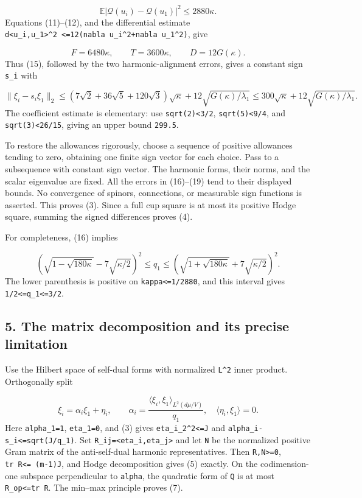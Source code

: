 \documentclass[
  11pt,
]{article}
\begin{document}
\[
 \mathbb E|\mathcal Q(u_i)-\mathcal Q(u_1)|^2\le2880\kappa.
 \tag{17}
\] Equations (11)--(12), and the differential estimate
\texttt{\textbar{}d\textless{}u\_i,u\_1\textgreater{}\textbar{}\^{}2\ \textless{}=12(\textbar{}nabla\ u\_i\textbar{}\^{}2+\textbar{}nabla\ u\_1\textbar{}\^{}2)},
give

\[
 F=6480\kappa,\qquad T=3600\kappa,\qquad D=12G(\kappa).
 \tag{18}
\] Thus (15), followed by the two harmonic-alignment errors, gives a
constant sign \texttt{s\_i} with

\[
 \|\xi_i-s_i\xi_1\|_2
 \le\left(7\sqrt2+36\sqrt5+120\sqrt3\right)\sqrt\kappa
                  +12\sqrt{G(\kappa)/\lambda_1}
 \le300\sqrt\kappa+12\sqrt{G(\kappa)/\lambda_1}.       \tag{19}
\] The coefficient estimate is elementary: use
\texttt{sqrt(2)\textless{}3/2}, \texttt{sqrt(5)\textless{}9/4}, and
\texttt{sqrt(3)\textless{}26/15}, giving an upper bound \texttt{299.5}.

To restore the allowances rigorously, choose a sequence of positive
allowances tending to zero, obtaining one finite sign vector for each
choice. Pass to a subsequence with constant sign vector. The harmonic
forms, their norms, and the scalar eigenvalue are fixed. All the errors
in (16)--(19) tend to their displayed bounds. No convergence of spinors,
connections, or measurable sign functions is asserted. This proves (3).
Since a full cup square is at most its positive Hodge square, summing
the signed differences proves (4).

For completeness, (16) implies

\[
 \left(\sqrt{1-\sqrt{180\kappa}}-7\sqrt{\kappa/2}\right)^2
 \le q_1\le
 \left(\sqrt{1+\sqrt{180\kappa}}+7\sqrt{\kappa/2}\right)^2.
 \tag{20}
\] The lower parenthesis is positive on
\texttt{kappa\textless{}=1/2880}, and this interval gives
\texttt{1/2\textless{}=q\_1\textless{}=3/2}.

\hypertarget{the-matrix-decomposition-and-its-precise-limitation}{%
\subsection{5. The matrix decomposition and its precise
limitation}\label{the-matrix-decomposition-and-its-precise-limitation}}

Use the Hilbert space of self-dual forms with normalized \texttt{L\^{}2}
inner product. Orthogonally split

\[
 \xi_i=\alpha_i\xi_1+\eta_i,\qquad
 \alpha_i=\frac{\langle\xi_i,\xi_1\rangle_{L^2(d\mu/V)}}{q_1},
 \quad \langle\eta_i,\xi_1\rangle=0.
\] Here \texttt{alpha\_1=1}, \texttt{eta\_1=0}, and (3) gives
\texttt{\textbar{}\textbar{}eta\_i\textbar{}\textbar{}\_2\^{}2\textless{}=J}
and \texttt{\textbar{}alpha\_i-s\_i\textbar{}\textless{}=sqrt(J/q\_1)}.
Set \texttt{R\_ij=\textless{}eta\_i,eta\_j\textgreater{}} and let
\texttt{N} be the normalized positive Gram matrix of the anti-self-dual
harmonic representatives. Then \texttt{R,N\textgreater{}=0},
\texttt{tr\ R\textless{}=\ (m-1)J}, and Hodge decomposition gives (5)
exactly. On the codimension-one subspace perpendicular to
\texttt{alpha}, the quadratic form of \texttt{Q} is at most
\texttt{\textbar{}\textbar{}R\textbar{}\textbar{}\_op\textless{}=tr\ R}.
The min--max principle proves (7).
\end{document}
